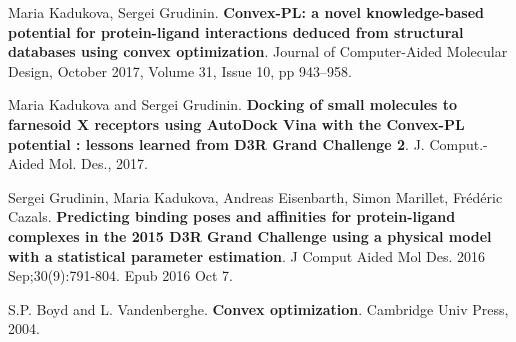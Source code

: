 \documentclass[12pt,twoside]{article}
\begin{document}
\begin{thebibliography}{1}
	Maria Kadukova, Sergei Grudinin.
	\textbf{Convex-PL: a novel knowledge-based potential for protein-ligand interactions deduced from structural databases using convex optimization}.
	Journal of Computer-Aided Molecular Design, October 2017, Volume 31, Issue 10, pp 943–958.
	
	Maria Kadukova and Sergei Grudinin.
	\textbf{Docking of small molecules to farnesoid X receptors using AutoDock Vina with the Convex-PL potential : lessons learned from D3R Grand Challenge 2}.
	J. Comput.-Aided Mol. Des., 2017. 
	
	Sergei Grudinin, Maria Kadukova, Andreas Eisenbarth, Simon Marillet, Frédéric Cazals.
	\textbf{Predicting binding poses and affinities for protein-ligand complexes in the 2015 D3R Grand Challenge using a physical model with a statistical parameter estimation}.
	J Comput Aided Mol Des. 2016 Sep;30(9):791-804. Epub 2016 Oct 7.
	
	S.P. Boyd and L. Vandenberghe.
	\textbf{Convex optimization}.
	Cambridge Univ Press, 2004.
	

	
\end{thebibliography}
\end{document}
